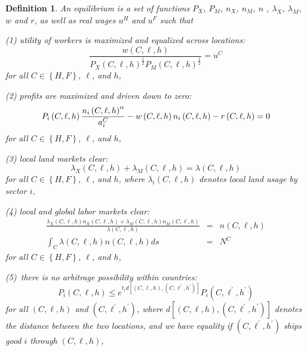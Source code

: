 \documentclass[12pt]{article}
\newtheorem{definition}{Definition}
\begin{document}
\begin{definition}
An equilibrium is a set of functions $P_{X}$, $P_{M}$, $n_{X}$, $n_{M}$, $n$%
, $\lambda _{X}$, $\lambda _{M}$, $w$ and $r$, as well as real wages $u^{H}$
and $u^{F}$ such that

(1) utility of workers is maximized and equalized across locations:%
\begin{equation*}
\frac{w\left( C,\ell ,h\right) }{P_{X}\left( C,\ell ,h\right) ^{\frac{1}{2}%
}P_{M}\left( C,\ell ,h\right) ^{\frac{1}{2}}}=u^{C}
\end{equation*}%
for all $C\in \left \{ H,F\right \} $, $\ell $, and $h$,

(2) profits are maximized and driven down to zero:%
\begin{equation*}
P_{i}\left( C,\ell ,h\right) \frac{n_{i}\left( C,\ell ,h\right) ^{\alpha }}{%
a_{i}^{C}}-w\left( C,\ell ,h\right) n_{i}\left( C,\ell ,h\right) -r\left(
C,\ell ,h\right) =0
\end{equation*}%
for all $C\in \left \{ H,F\right \} $, $\ell $, and $h$,

(3) local land markets clear:%
\begin{equation*}
\lambda _{X}\left( C,\ell ,h\right) +\lambda _{M}\left( C,\ell ,h\right)
=\lambda \left( C,\ell ,h\right)
\end{equation*}%
for all $C\in \left \{ H,F\right \} $, $\ell $, and $h$, where $\lambda
_{i}\left( C,\ell ,h\right) $ denotes local land usage by sector $i$,

(4) local and global labor markets clear:%
\begin{eqnarray*}
\frac{\lambda _{X}\left( C,\ell ,h\right) n_{X}\left( C,\ell ,h\right)
+\lambda _{M}\left( C,\ell ,h\right) n_{M}\left( C,\ell ,h\right) }{\lambda
\left( C,\ell ,h\right) } &=&n\left( C,\ell ,h\right) \\
\int_{C}\lambda \left( C,\ell ,h\right) n\left( C,\ell ,h\right) ds &=&N^{C}
\end{eqnarray*}%
for all $C\in \left \{ H,F\right \} $, $\ell $, and $h$,

(5)\ there is no arbitrage possibility within countries:%
\begin{equation*}
P_{i}\left( C,\ell ,h\right) \leq e^{t_{i}d\left[ \left( C,\ell ,h\right)
,\left( C,\ell ^{\prime },h^{\prime }\right) \right] }P_{i}\left( C,\ell
^{\prime },h^{\prime }\right)
\end{equation*}%
for all $\left( C,\ell ,h\right) $ and $\left( C,\ell ^{\prime },h^{\prime
}\right) $, where $d\left[ \left( C,\ell ,h\right) ,\left( C,\ell ^{\prime
},h^{\prime }\right) \right] $ denotes the distance between the two
locations, and we have equality if $\left( C,\ell ^{\prime },h^{\prime
}\right) $ ships good $i$ through $\left( C,\ell ,h\right) $,


\end{definition}
\end{document}
